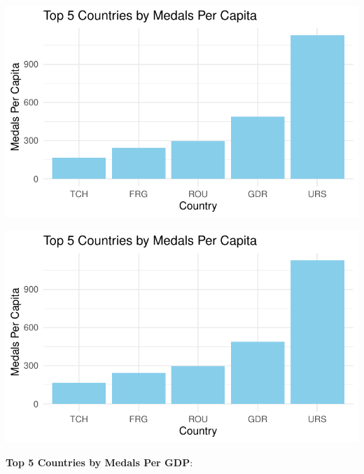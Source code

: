 \documentclass[12pt,preprint, authoryear]{elsarticle}
\let\origfigure\figure
\let\endorigfigure\endfigure
\renewenvironment{figure}[1][2] {
    \expandafter\origfigure\expandafter[H]
} {
    \endorigfigure
}
\numberwithin{equation}{section}
\numberwithin{figure}{section}
\numberwithin{table}{section}
\begin{document}
\begin{figure}

{\centering \includegraphics{README_files/figure-latex/unnamed-chunk-2-1} 

}

\caption{The Top Countries that Dominate Winning Medals Per Capita\label{Figure2}}\label{fig:unnamed-chunk-2-1}
\end{figure}
\begin{figure}

{\centering \includegraphics{README_files/figure-latex/unnamed-chunk-2-2} 

}

\caption{The Top Countries that Dominate Winning Medals Per Capita\label{Figure2}}\label{fig:unnamed-chunk-2-2}
\end{figure}

\textbf{Top 5 Countries by Medals Per GDP}:
\end{document}
